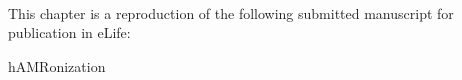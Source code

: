 \mbox{}\\
\vspace{8cm}


This chapter is a reproduction of the following submitted manuscript for publication in eLife:

hAMRonization

